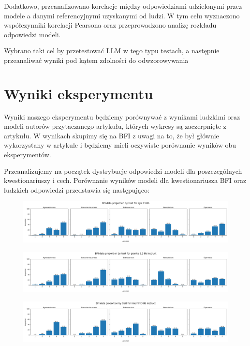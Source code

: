 \documentclass{article}
\begin{document}
Dodatkowo, przeanalizowano korelacje między odpowiedziami udzielonymi przez modele a danymi referencyjnymi uzyskanymi od ludzi. W tym celu wyznaczono współczynniki korelacji Pearsona oraz przeprowadzono analizę rozkładu odpowiedzi modeli.

Wybrano taki cel by przetestować LLM w tego typu testach, a następnie przeanaliwać wyniki pod kątem zdolności do odwzorowywania

\section{Wyniki eksperymentu}
Wyniki naszego eksperymentu będziemy porównywać z wynikami ludzkimi oraz modeli autorów przytaczanego artykułu, których wykresy są zaczerpnięte z artykułu. 
W wynikach skupimy się na BFI z uwagi na to, że był głównie wykorzystany w artykule i będziemy mieli oczywiste porównanie wyników obu eksperymentów.

Przeanalizujemy na początek dystrybucje odpowiedzi modeli dla poszczególnych kwestionariuszy i cech. Porównanie wyników modeli dla kwestionariusza BFI oraz ludzkich odpowiedzi przedstawia się następująco:

\begin{figure}[H]
    \centering
    \includegraphics[width=0.7 \linewidth]{../Prompt_code/plots/aya-23-8b/bfi_distribution.png}
\end{figure}

\begin{figure}[H]
    \centering
    \includegraphics[width=0.7 \linewidth]{../Prompt_code/plots/granite-3.3-8b-instruct/bfi_distribution.png}
\end{figure}

\begin{figure}[H]
    \centering
    \includegraphics[width=0.7 \linewidth]{../Prompt_code/plots/internlm3-8b-instruct/bfi_distribution.png}
\end{figure}
\end{document}
